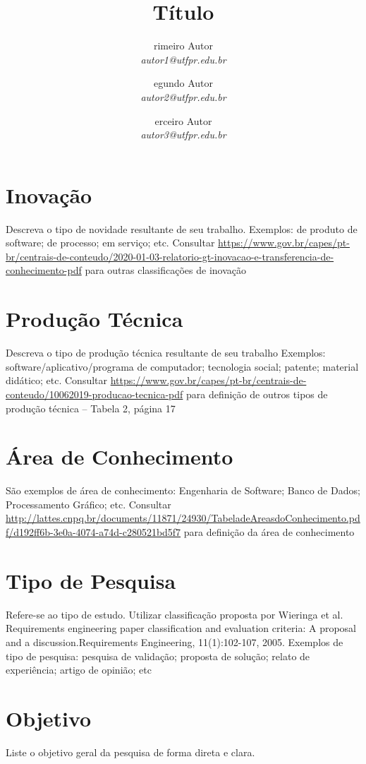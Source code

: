 \documentclass{ppgi-resumo}
\author{
  \fcolorbox{colorUTFPR}{colorUTFPR}{\textbf{P}}rimeiro Autor\\
  \textit{autor1@utfpr.edu.br}
  \and
  \fcolorbox{colorUTFPR}{colorUTFPR}{\textbf{S}}egundo Autor\\
  \textit{autor2@utfpr.edu.br}
  \and
  \fcolorbox{colorUTFPR}{colorUTFPR}{\textbf{T}}erceiro Autor\\
  \textit{autor3@utfpr.edu.br}
}
\title{Título}
\begin{document}
   
\maketitle

\section*{Inovação}
\textcolor{colorUTFPR}{Descreva o tipo de novidade resultante de seu trabalho. Exemplos: de produto de software; de processo; em serviço; etc. Consultar \url{https://www.gov.br/capes/pt-br/centrais-de-conteudo/2020-01-03-relatorio-gt-inovacao-e-transferencia-de-conhecimento-pdf} para outras classificações de inovação}

\section*{Produção Técnica}
\textcolor{colorUTFPR}{Descreva o tipo de produção técnica resultante de seu trabalho Exemplos: software/aplicativo/programa de computador; tecnologia social; patente; material didático; etc. Consultar \url{https://www.gov.br/capes/pt-br/centrais-de-conteudo/10062019-producao-tecnica-pdf} para definição de outros tipos de produção técnica – Tabela 2, página 17}

\section*{Área de Conhecimento}
\textcolor{colorUTFPR}{São exemplos de área de conhecimento: Engenharia de Software; Banco de Dados; Processamento Gráfico; etc. Consultar 
\url{http://lattes.cnpq.br/documents/11871/24930/TabeladeAreasdoConhecimento.pdf/d192ff6b-3e0a-4074-a74d-c280521bd5f7} para definição da área de conhecimento}

\section*{Tipo de Pesquisa}
\textcolor{colorUTFPR}{Refere-se ao tipo de estudo. Utilizar classificação proposta por Wieringa et al. Requirements engineering paper classification and evaluation criteria: A proposal and a discussion.Requirements Engineering, 11(1):102-107, 2005. Exemplos de tipo de pesquisa:  pesquisa de validação; proposta de solução; relato de experiência; artigo de opinião; etc}

\section*{Objetivo}
\vspace{-0.7cm}
\noindent
        \vspace{0.4cm}
        \textcolor{colorUTFPR}{Liste o objetivo geral da pesquisa de forma direta e clara.}
        \vspace{0.3cm}
        
\end{document}

